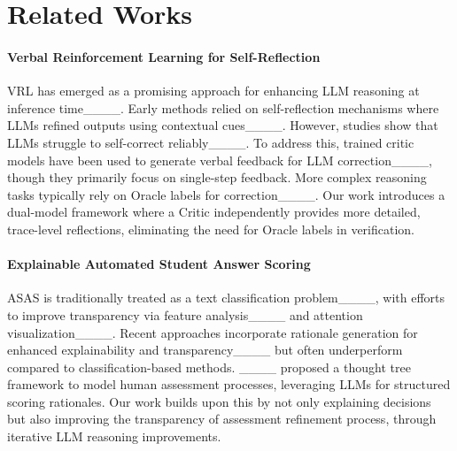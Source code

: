 \section{Related Works}
\paragraph{Verbal Reinforcement Learning for Self-Reflection}
VRL has emerged as a promising approach for enhancing LLM reasoning at inference time____. Early methods relied on self-reflection mechanisms where LLMs refined outputs using contextual cues____. However, studies show that LLMs struggle to self-correct reliably____. To address this, trained critic models have been used to generate verbal feedback for LLM correction____, though they primarily focus on single-step feedback. More complex reasoning tasks typically rely on Oracle labels for correction____. Our work introduces a dual-model framework where a Critic independently provides more detailed, trace-level reflections, eliminating the need for Oracle labels in verification.

\paragraph{Explainable Automated Student Answer Scoring}
ASAS is traditionally treated as a text classification problem____, with efforts to improve transparency via feature analysis____ and attention visualization____. Recent approaches incorporate rationale generation for enhanced explainability and transparency____ but often underperform compared to classification-based methods. ____ proposed a thought tree framework to model human assessment processes, leveraging LLMs for structured scoring rationales. Our work builds upon this by not only explaining decisions but also improving the transparency of assessment refinement process, through iterative LLM reasoning improvements.